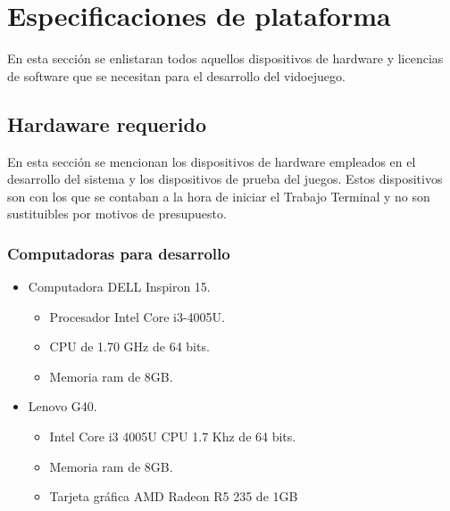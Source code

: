 \section{Especificaciones de plataforma}\label{Sec_Plataforma}
En esta sección se enlistaran todos aquellos dispositivos de hardware y licencias
 de software que se necesitan para el desarrollo del vidoejuego.
 
 \subsection{Hardaware requerido}\label{Sec_PlataformaHw}
 En esta sección se mencionan los dispositivos de hardware empleados en el 
 desarrollo del sistema y los dispositivos de prueba del juegos. Estos 
 dispositivos son con los que se contaban a la hora de iniciar el Trabajo Terminal
 y no son sustituibles por motivos de presupuesto.
 	\subsubsection{Computadoras para desarrollo}
 		\begin{itemize}
 			\item Computadora DELL Inspiron 15.
 				\begin{itemize}
 					\item Procesador Intel Core i3-4005U. 
 					\item CPU de 1.70 GHz de 64 bits. 
 					\item Memoria ram de 8GB.
 				\end{itemize}
			\item Lenovo G40. 
				\begin{itemize}
					\item Intel Core i3 4005U CPU 1.7 Khz de 64 bits. 
					\item Memoria ram de 8GB. 
					\item Tarjeta gráfica AMD Radeon R5 235 de 1GB
				\end{itemize}
 		\end{itemize}
 		

